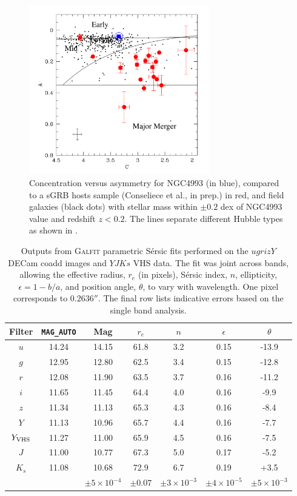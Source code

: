 \begin{figure}
\centering
\includegraphics[width=0.7\textwidth]{./chapters/chapter3/Figures/f2.pdf}\caption{Concentration versus asymmetry for NGC4993 (in blue), compared to a sGRB hosts sample (Conseliece et al., in prep.) in red, and field galaxies (black dots) with stellar mass within $\pm 0.2$ dex of NGC4993 value and redshift $z<0.2$. The lines separate different Hubble types as shown in \citet{conselice}.}\label{sgrb}\end{figure}

\begin{table}
\centering
\begin{tabular}{c|cccccc}
\hline
\hline

Filter & \texttt{MAG\_AUTO} & Mag & $r_e$ & $n$ & $\epsilon$ & $\theta$\\
\hline
$u$ & 14.24 & 14.15 & 61.8 & 3.2 & 0.15 & -13.9\\
$g$ & 12.95 & 12.80 & 62.5 & 3.4 & 0.15 & -12.8\\
$r$ & 12.08 & 11.90 & 63.5 & 3.7 & 0.16 & -11.2\\
$i$ & 11.65 & 11.45 & 64.4 & 4.0 & 0.16 & -9.9\\
$z$ & 11.34 & 11.13 & 65.3 & 4.3 & 0.16 & -8.4\\
$Y$ & 11.13 & 10.96 & 65.7 & 4.4 & 0.16 & -7.7\\
$Y_{{\rm VHS}}$ & 11.27 & 11.00 & 65.9 & 4.5 & 0.16 & -7.5\\
$J$ & 11.00 & 10.77 & 67.3 & 5.0 & 0.17 & -5.2\\
$K_s$ & 11.08 & 10.68 & 72.9 & 6.7 & 0.19 & +3.5\\
\hline
 & & $\pm 5\times10^{-4}$ & $\pm 0.07$ & $\pm 3\times10^{-3}$ & $\pm 4\times10^{-5}$ & $\pm 5\times10^{-3}$ \\
\hline

\end{tabular}\caption{Outputs from \textsc{Galfit} parametric S\'ersic fits performed on the $ugrizY$ DECam coadd images and $YJKs$ VHS data. The fit was joint across bands, allowing the effective radius, $r_e$ (in pixels), S\'ersic index, $n$, ellipticity, $\epsilon=1-b/a$, and position angle, $\theta$, to vary with wavelength. One pixel corresponds to $0.2636''$. The final row lists indicative errors based on the single band analysis.}\label{tablefit}
\end{table}


